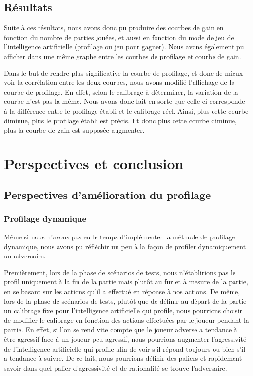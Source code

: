 \documentclass{report}
\begin{document}
\section{Résultats}
\hspace{0.5cm}Suite à ces résultats, nous avons donc pu produire des courbes de gain en fonction du nombre de parties jouées, et aussi en fonction du mode de jeu de l'intelligence artificielle (profilage ou jeu pour gagner). Nous avons également pu afficher dans une même graphe entre les courbes de profilage et courbe de gain.\par
Dans le but de rendre plus significative la courbe de profilage, et donc de mieux voir la corrélation entre les deux courbes, nous avons modifié l'affichage de la courbe de profilage. En effet, selon le calibrage à déterminer, la variation de la courbe n'est pas la même. Nous avons donc fait en sorte que celle-ci corresponde à la différence entre le profilage établi et le calibrage réel. Ainsi, plus cette courbe diminue, plus le profilage établi est précis. Et donc plus cette courbe diminue, plus la courbe de gain est supposée augmenter.\\
 

\chapter{Perspectives et conclusion}
\section{Perspectives d'amélioration du profilage}
\subsection{Profilage dynamique}
\hspace{0.5cm}Même si nous n'avons pas eu le temps d'implémenter la méthode de profilage dynamique, nous avons pu réfléchir un peu à la façon de profiler dynamiquement un adversaire.\par
Premièrement, lors de la phase de scénarios de tests, nous n'établirions pas le profil uniquement à la fin de la partie mais plutôt au fur et à mesure de la partie, en se basant sur les actions qu'il a effectué en réponse à nos actions. De même, lors de la phase de scénarios de tests, plutôt que de définir au départ de la partie un calibrage fixe pour l'intelligence artificielle qui profile, nous pourrions choisir de modifier le calibrage en fonction des actions effectuées par le joueur pendant la partie. En effet, si l'on se rend vite compte que le joueur adverse a tendance à être agressif face à un joueur peu agressif, nous pourrions augmenter l'agressivité de l'intelligence artificielle qui profile afin de voir s'il répond toujours ou bien s'il a tendance à suivre. De ce fait, nous pourrions définir des paliers et rapidement savoir dans quel palier d'agressivité et de rationalité se trouve l'adversaire.\\
\end{document}
